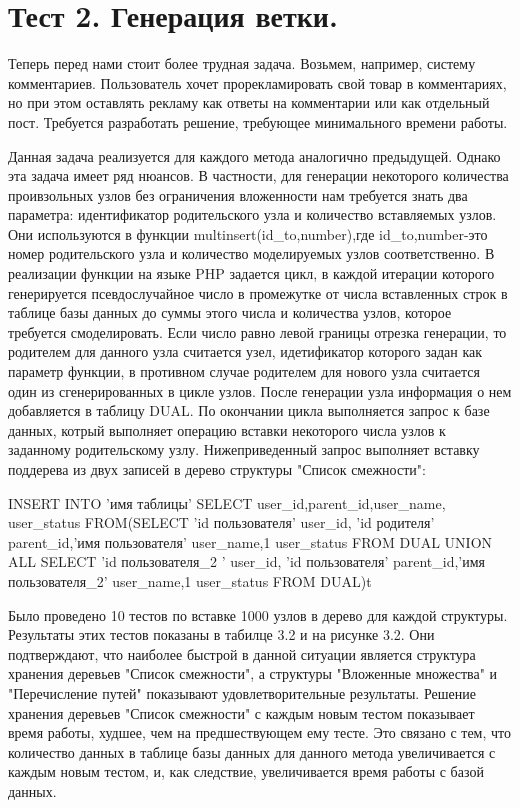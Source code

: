\documentclass[a4paper,14pt]{extreport}
\theoremstyle{definition}
\begin{document}
\section{Тест 2. Генерация ветки.}
Теперь перед нами стоит более трудная задача. Возьмем, например, систему комментариев. Пользователь хочет прорекламировать свой товар в комментариях, но при этом оставлять рекламу как ответы на комментарии или как отдельный пост. Требуется разработать решение, требующее минимального времени работы.

Данная задача реализуется для каждого метода аналогично предыдущей. Однако эта задача имеет ряд нюансов. В частности, для генерации некоторого количества проивзольных узлов без ограничения вложенности нам требуется знать два параметра: идентификатор родительского узла и количество вставляемых узлов. Они используются в функции multinsert(\textdollar id\_to,\textdollar number),где \textdollar id\_to,\textdollar number-это номер родительского узла и количество моделируемых узлов соответственно. В реализации функции на языке PHP задается цикл, в каждой итерации которого генерируется псевдослучайное число в промежутке от числа вставленных строк в таблице базы данных до суммы этого числа и количества узлов, которое требуется смоделировать. Если число равно левой границы отрезка генерации, то родителем для данного узла считается узел, идетификатор которого задан как параметр функции, в противном случае родителем для нового узла считается один из сгенерированных в цикле узлов. После генерации узла информация о нем добавляется в таблицу DUAL. По окончании цикла выполняется запрос к базе данных, котрый выполняет операцию вставки некоторого числа узлов к заданному родительскому узлу. Нижеприведенный запрос выполняет вставку поддерева из двух записей в дерево структуры "Список смежности":

 INSERT INTO 'имя таблицы' SELECT user\_id,parent\_id,user\_name,\\user\_status FROM(SELECT 'id пользователя' user\_id, 'id родителя' \\parent\_id,'имя пользователя' user\_name,1 user\_status FROM DUAL UNION ALL SELECT 'id пользователя\_2 ' user\_id, 'id пользователя' parent\_id,'имя пользователя\_2' user\_name,1 user\_status FROM DUAL)t

Было проведено 10 тестов по вставке 1000 узлов в дерево для каждой структуры. Результаты этих тестов показаны в табилце 3.2 и на рисунке 3.2. Они подтверждают, что наиболее быстрой в данной ситуации является структура хранения деревьев "Список смежности", а структуры "Вложенные множества" и "Перечисление путей" показывают удовлетворительные результаты. Решение хранения деревьев "Список смежности" с каждым новым тестом показывает время работы, худшее, чем на предшествующем ему тесте. Это связано с тем, что количество данных в таблице базы данных для данного метода увеличивается с каждым новым тестом, и, как следствие, увеличивается время работы с базой данных.
\end{document}
